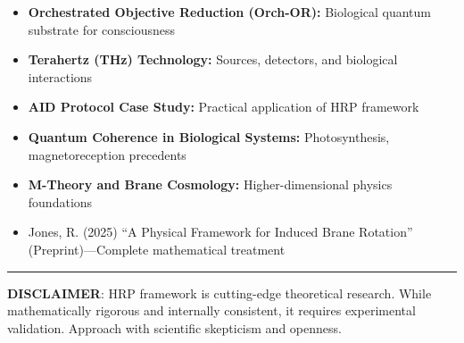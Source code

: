 \begin{itemize}
\item \textbf{Orchestrated Objective Reduction (Orch-OR):} Biological quantum substrate for consciousness
\item \textbf{Terahertz (THz) Technology:} Sources, detectors, and biological interactions
\item \textbf{AID Protocol Case Study:} Practical application of HRP framework
\item \textbf{Quantum Coherence in Biological Systems:} Photosynthesis, magnetoreception precedents
\item \textbf{M-Theory and Brane Cosmology:} Higher-dimensional physics foundations
\item Jones, R. (2025) ``A Physical Framework for Induced Brane Rotation'' (Preprint)---Complete mathematical treatment
\end{itemize}

\begin{center}\rule{0.5\linewidth}{0.5pt}\end{center}

\textbf{DISCLAIMER}: HRP framework is cutting-edge theoretical research. While mathematically rigorous and internally consistent, it requires experimental validation. Approach with scientific skepticism and openness.
